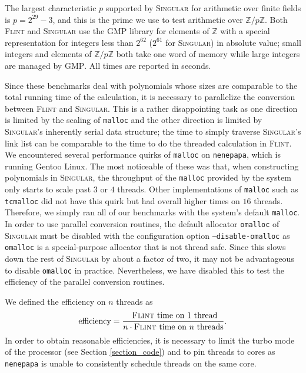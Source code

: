 \documentclass{deliverablereport}
\begin{document}
The largest characteristic $p$ supported by \textsc{Singular} for arithmetic over finite fields is $p = 2^{29}-3$, and this is the prime we use to test arithmetic over $\mathbb{Z}/p \mathbb{Z}$. Both \textsc{Flint} and \textsc{Singular} use the \textsc{GMP} library for elements of $\mathbb{Z}$ with a special representation for integers less than $2^{62}$ ($2^{61}$ for \textsc{Singular}) in absolute value; small integers and elements of $\mathbb{Z}/p \mathbb{Z}$ both take one word of memory while large integers are managed by \textsc{GMP}. All times are reported in seconds.

Since these benchmarks deal with polynomials whose sizes are comparable to the total running time of the calculation, it is necessary to parallelize the conversion between \textsc{Flint} and \textsc{Singular}. This is a rather disappointing task as one direction is limited by the scaling of {\tt malloc} and the other direction is limited by \textsc{Singular}'s inherently serial data structure; the time to simply traverse \textsc{Singular}'s link list can be comparable to the time to do the threaded calculation in \textsc{Flint}. We encountered several performance quirks of {\tt malloc} on {\tt nenepapa}, which is running Gentoo Linux. The most noticeable of these was that, when constructing polynomials in \textsc{Singular}, the throughput of the {\tt malloc} provided by the system only starts to scale past $3$ or $4$ threads. Other implementations of {\tt malloc} such as {\tt tcmalloc} did not have this quirk but had overall higher times on $16$ threads. Therefore, we simply ran all of our benchmarks with the system's default {\tt malloc}. In order to use parallel conversion routines, the default allocator {\tt omalloc} of \textsc{Singular} must be disabled with the configuration option {\tt --disable-omalloc} as {\tt omalloc} is a special-purpose allocator that is not thread safe. Since this slows down the rest of \textsc{Singular} by about a factor of two, it may not be advantageous to disable {\tt omalloc} in practice. Nevertheless, we have disabled this to test the efficiency of the parallel conversion routines. 

We defined the efficiency on $n$ threads as
\begin{equation*}
\text{efficiency} = \frac{\text{ \textsc{Flint} time on $1$ thread}}{n \cdot \text{\textsc{Flint} time on $n$ threads}}\text{.}
\end{equation*}
In order to obtain reasonable efficiencies, it is necessary to limit the turbo mode of the processor (see Section \ref{section_code}) and to pin threads to cores as {\tt nenepapa} is unable to consistently schedule threads on the same core.
\end{document}
